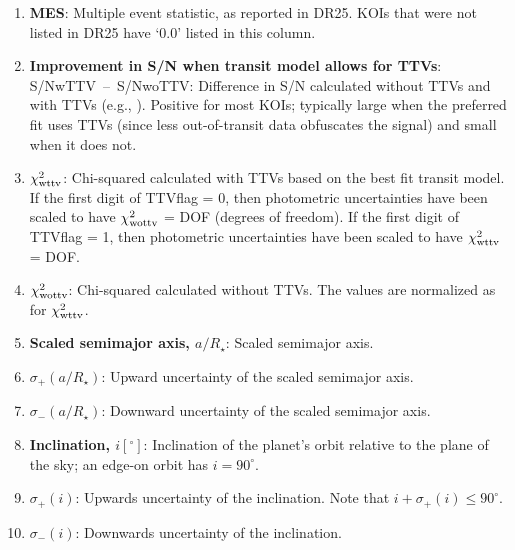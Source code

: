 \documentclass{aastex62}
\begin{document}
\begin{enumerate}
   \item \textbf{MES}: Multiple event statistic, as reported in DR25.  KOIs that were not listed in DR25 have `0.0' listed in this column. 
   \item \textbf{Improvement in S/N when transit model allows for TTVs}: S/NwTTV~--~S/NwoTTV: Difference in S/N calculated without TTVs and with TTVs (e.g., \citealt{Ofir:2018}). Positive for most KOIs; typically large when the preferred fit uses TTVs (since less out-of-transit data obfuscates the signal) and small when it does not. 
   \item \textbf{$\chi^2_{\rm wttv}$}: Chi-squared calculated with TTVs based on the best fit transit model.  If the first digit of TTVflag = 0, then photometric uncertainties have been scaled to have $\chi^2_{\rm wottv}$ = DOF (degrees of freedom).  If the first digit of TTVflag = 1, then photometric uncertainties have been scaled to have $\chi^2_{\rm wttv}$ = DOF. 
   \item \textbf{$\chi^2_{\rm wottv}$}: Chi-squared calculated without TTVs.  The values are normalized as for $\chi^2_{\rm wttv}$. 
   \item \textbf{Scaled semimajor axis, $a/R_\star$}: Scaled semimajor axis.
   \item \textbf{$\sigma_+(a/R_\star)$}: Upward uncertainty of the scaled semimajor axis.
   \item \textbf{$\sigma_-(a/R_\star)$}: Downward uncertainty of the scaled semimajor axis.
   \item \textbf{Inclination, $i [^\circ]$}: Inclination of the planet's orbit relative to the plane of the sky; an edge-on orbit has $i = 90^\circ$. 
   \item \textbf{$\sigma_+(i)$}: Upwards uncertainty of the inclination. Note that $i+\sigma_+(i) \le 90^\circ$.
   \item \textbf{$\sigma_-(i)$}: Downwards uncertainty of the inclination.

\end{enumerate}
\end{document}
